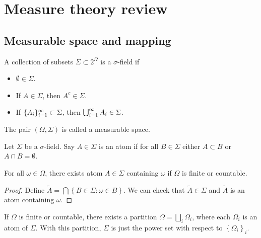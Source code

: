\documentclass[a4paper]{article}
\author{Notes taken by \nauthor\vspace{5pt}\\
Lectures by Konstantin Tikhomirov\vspace{5pt}\\
Carnegie Mellon University}
\begin{document}
\maketitle

\tableofcontents

\section{Measure theory review}

\subsection{Measurable space and mapping}

\begin{defi}
  A collection of subsets $\Sigma \subset 2^{\Omega}$ is a $\sigma$-field if
  \begin{itemize}
    \item $\emptyset \in \Sigma$.
    \item If $A \in \Sigma$, then $A^c \in \Sigma$.
    \item If $\{ A_i \}_{i=1}^\infty \subset \Sigma$, then $\bigcup_{i=1}^\infty A_i \in \Sigma$.
  \end{itemize}
  The pair $(\Omega, \Sigma)$ is called a measurable space.
\end{defi}

\begin{defi}[atom]
  Let $\Sigma$ be a $\sigma$-field. Say $A \in \Sigma$ is an atom
  if for all $B \in \Sigma$ either $A \subset B$ or $A \cap B = \emptyset$.
\end{defi}

\begin{prop}
  For all $\omega \in \Omega$, there exists atom $A \in \Sigma$ containing
  $\omega$ if $\Omega$ is finite or countable.
\end{prop}

\begin{proof}
  Define $\tilde{A} = \bigcap \left\{ B \in \Sigma :
    \omega \in B \right\}$. We can check that $\tilde{A} \in \Sigma$
  and $\tilde{A}$ is an atom containing $\omega$.

\end{proof}

\begin{cor}
  If $\Omega$ is finite or countable, there exists a partition
  $\Omega = \bigsqcup_i \Omega_i$,
  where each $\Omega_i$ is an atom of $\Sigma$. With this partition,
  $\Sigma$ is just the power set with respect to $\left\{ \Omega_i \right\}_i$.
\end{cor}
\end{document}
